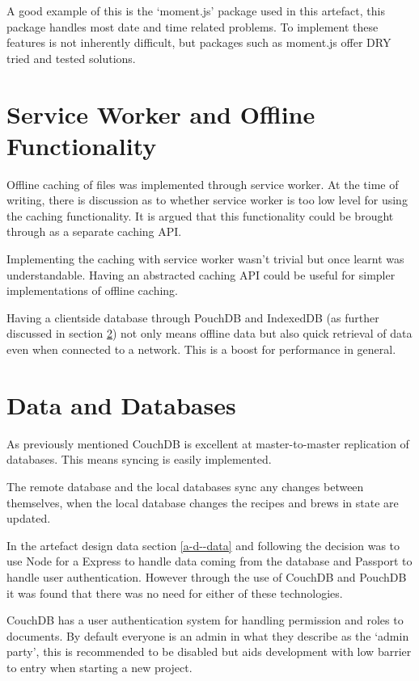 A good example of this is the `moment.js' package used in this artefact, this package handles most date and time related problems. To implement these features is not inherently difficult, but packages such as moment.js offer DRY tried and tested solutions. \cite{moment.js}

\section{Service Worker and Offline Functionality} \label{s-i--sw-offline}

Offline caching of files was implemented through service worker. At the time of writing, there is discussion as to whether service worker is too low level for using the caching functionality. It is argued that this functionality could be brought through as a separate caching API. \cite{sw_sledgehammer}

Implementing the caching with service worker wasn't trivial but once learnt was understandable. Having an abstracted caching API could be useful for simpler implementations of offline caching.

Having a clientside database through PouchDB and IndexedDB (as further discussed in section \ref{s-i--data-and-databases}) not only means offline data but also quick retrieval of data even when connected to a network. This is a boost for performance in general.

\section{Data and Databases} \label{s-i--data-and-databases}

As previously mentioned CouchDB is excellent at master-to-master replication of databases. This means syncing is easily implemented.

The remote database and the local databases sync any changes between themselves, when the local database changes the recipes and brews in state are updated.

In the artefact design data section \ref{a-d--data} and following the decision was to use Node for a Express to handle data coming from the database and Passport to handle user authentication. However through the use of CouchDB and PouchDB it was found that there was no need for either of these technologies.

CouchDB has a user authentication system for handling permission and roles to documents. By default everyone is an admin in what they describe as the `admin party', this is recommended to be disabled but aids development with low barrier to entry when starting a new project.

